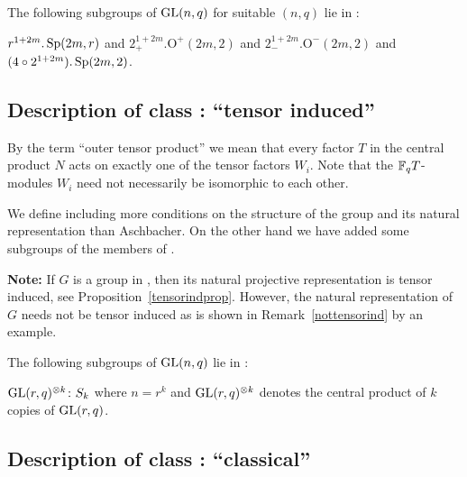 \smallskip
\exmemb
The following subgroups of $\GL(n,q)$ for suitable $(n,q)$ lie in :

$r^{1+2m}.\Sp(2m,r)$ and $2_+^{1+2m}.\mathrm{O}^+(2m,2)$ and 
$2_-^{1+2m}.\mathrm{O}^-(2m,2)$ and $(4 \circ 2^{1+2m}).\Sp(2m,2)$.


\subsection{Description of class : ``tensor induced''}
\label{descD7}
%
%


By the term ``outer tensor product'' we mean that every factor
$T$ in the central product $N$ acts on exactly one of the tensor factors $W_i$.
Note that the $\mathbb{F}_q T$-modules $W_i$ need not necessarily be
isomorphic to each other.

\medskip
{} 
We define  including more conditions on the structure of the group
and its natural representation than Aschbacher. On the other hand we
have added some subgroups of the members of .

\smallskip
\textbf{Note:} 
If $G$ is a
group in , then its natural projective representation
is tensor induced,
see Proposition~\ref{tensorindprop}. However, the natural
representation of $G$ needs not be tensor induced as is shown in
Remark~\ref{nottensorind} by an example.

\smallskip
\exmemb
The following subgroups of $\GL(n,q)$ lie in :

$\GL(r,q)^{\otimes k}\colon S_k$ where $n=r^k$ and $\GL(r,q)^{\otimes k}$ 
denotes the central product of $k$ copies of $\GL(r,q)$.

\subsection{Description of class : ``classical''}
\label{descD8}
%
%

